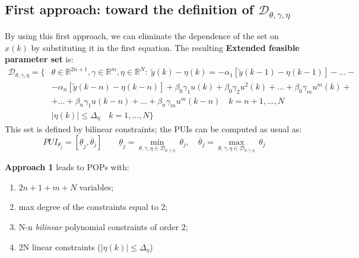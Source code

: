 \subsection{First approach: toward the definition of $\mathcal{D}_{\theta,\gamma,\eta}$}
By using this first approach, we can eliminate the dependence of the set on $x(k)$ by substituting it in the first equation. The resulting \textbf{Extended feasible parameter set} is:
\begin{equation}
    \begin{aligned}
        \mathcal{D}_{\theta,\gamma, \eta}=\{&
        \theta\in\mathbb{R}^{2n+1}, \gamma\in\mathbb{R}^{m}, \eta\in\mathbb{R}^N: \  
        \tilde{y}(k)-\eta(k)=-\alpha_1[\tilde{y}(k-1)-\eta(k-1)]-\dots-\\
        &-\alpha_n[\tilde{y}(k-n)-\eta(k-n)] +
        \beta_0\gamma_1{u(k)} + \beta_0{\gamma_2}{u^2(k)} +\dots+\beta_0\gamma_m{u^m(k)}+\\
        &+...+\beta_n{\gamma_1}{u(k-n)}+...+\beta_n{\gamma_m}{u^m(k-n)} \quad k=n+1,...,N\\
        &\vert \eta(k) \vert \le \Delta_\eta \quad k=1,...,N
    \}
    \end{aligned}
\end{equation}
This set is defined by bilinear constraints; the PUIs can be computed as usual as: 
\begin{equation}
    PUI_{\theta_j} = [
        \underline{\theta}_j,
        \overline{\theta}_j
    ] \qquad 
    \underline{\theta}_j=\min_{\theta,\gamma,\eta\in{\mathcal{D}_{\theta,\gamma,\eta}}} \ {\theta_j}, \quad
    \overline{\theta}_j=\max_{\theta,\gamma,\eta\in{\mathcal{D}_{\theta,\gamma,\eta}}} \ {\theta_j} 
\end{equation}

\begin{remark}
    \textbf{Approach 1} leads to POPs with:
    \begin{enumerate}
        \itemsep-0.2em
        \item $2n+1+m+N$ variables; 
        \item max degree of the constraints equal to 2; 
        \item N-n \textit{bilinear} polynomial constraints of order 2; 
        \item 2N linear constraints (\small{$\vert \eta(k) \vert \le \Delta_\eta$})
    \end{enumerate}
\end{remark}

